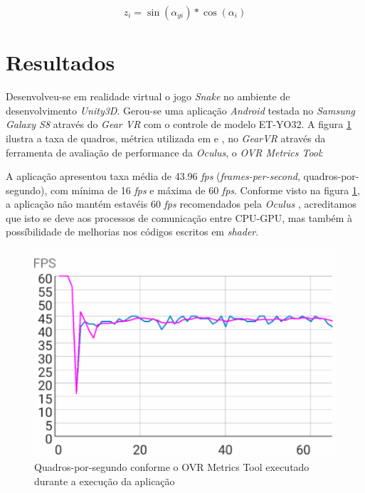 \documentclass{SBCbookchapter}
\begin{document}
\begin{equation}
z_{i} = \sin(\alpha_{yi}) * \cos(\alpha_i)
\label{equation4}
\end{equation}

\section{Resultados} \label{sec:results}
Desenvolveu-se em realidade virtual o jogo \textit{Snake} no ambiente de desenvolvimento \textit{Unity3D}. Gerou-se uma aplicação \textit{Android} testada no \textit{Samsung Galaxy S8} através do \textit{Gear VR} com o controle de modelo ET-YO32. A figura \ref{fig:VRPerformance} ilustra a taxa de quadros, métrica utilizada em \cite{GPGPUWars} e \cite{GPGPUTechniques}, no \textit{GearVR} através da ferramenta de avaliação de performance da \textit{Oculus}, o \textit{OVR Metrics Tool}:

A aplicação apresentou taxa média de 43.96 \textit{fps} (\textit{frames-per-second}, quadros-por-segundo), com mínima de 16 \textit{fps} e máxima de 60 \textit{fps}. Conforme visto na figura \ref{fig:VRPerformance}, a aplicação não mantém estavéis 60 \textit{fps} recomendados pela \textit{Oculus} \cite{OculusVRGuidelines}, acreditamos que isto se deve aos processos de comunicação entre CPU-GPU, mas também à possíbilidade de melhorias nos códigos escritos em \textit{shader}.

\begin{figure}[H]
\centering
\includegraphics[scale=0.5]{../../images/VRPerformance}
\caption{Quadros-por-segundo conforme o OVR Metrics Tool executado durante a execução da aplicação} \label{fig:VRPerformance}
\end{figure}
\end{document}

